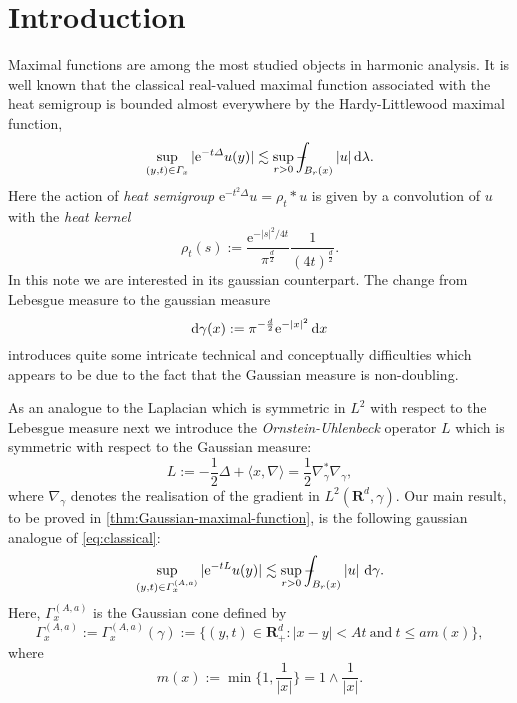 \documentclass[a4paper,oneside,10pt]{amsproc}
\theoremstyle{remark}
\newcommand{\D}{\,\textup{d}}
\newcommand{\la}{\langle}
\newcommand{\ra}{\rangle}
\def\Xint#1{\mathchoice
  {\XXint\displaystyle\textstyle{#1}}%
  {\XXint\textstyle\scriptstyle{#1}}%
  {\XXint\scriptstyle\scriptscriptstyle{#1}}%
  {\XXint\scriptscriptstyle\scriptscriptstyle{#1}}%
  \!\int}
\def\XXint#1#2#3{{\setbox0=\hbox{$#1{#2#3}{\int}$ }
    \vcenter{\hbox{$#2#3$ }}\kern-.535\wd0}}
\def\dashint{\Xint-}
\renewcommand{\leq}{\leqslant}
\renewcommand{\leq}{\leqslant}
\newcommand{\R}{\mathbf R}
\newcommand{\e}{\mathrm{e}} %
\renewcommand{\leq}{\leqslant}%
\begin{document}
\section{Introduction}
Maximal functions are among the most studied objects in harmonic
analysis. 
It is well known that the classical real-valued maximal
function associated with the heat semigroup is bounded almost everywhere
by the Hardy-Littlewood maximal function, 
\begin{equation}\label{eq:classical}
  \sup_{(y, t) \in \Gamma_x} |\e^{-t \Delta} u(y)| \lesssim \sup_{r
    > 0}  \dashint_{B_r(x)} |u| \D\lambda.
\end{equation}
Here the action of \emph{heat semigroup} $\e^{-t^2 \Delta} u = \rho_t \ast u$ is
given by a convolution of $u$ with the \emph{heat kernel}
\begin{equation*}
  \rho_t(s) := \frac{\e^{-|s|^2/4t}}{\pi^{\frac{d}2}}
  \frac1{(4t)^{\frac{d}2}}.
\end{equation*}
In this note we are interested in its gaussian counterpart. 
The change from Lebesgue measure to the gaussian measure
\begin{equation}
  \label{eq:Gaussian-measure}
  \mathrm{d}\gamma(x) := \pi^{-\frac{d}2} \e^{-|x|^2} \D{x}
\end{equation}
introduces quite
some intricate technical and conceptually difficulties which appears
to be due to the fact that the Gaussian measure is non-doubling.

As an analogue to the Laplacian which is symmetric in $L^2$ with
respect to the Lebesgue measure next we introduce the
\emph{Ornstein-Uhlenbeck} operator $L$ which is symmetric with respect
to the Gaussian measure:
\begin{equation}
  \label{eq:Ornstein-Uhlenbeck-operator}
  L := -\frac12 \Delta + \la x, \nabla \ra = \frac12 \nabla_\gamma^* \nabla_\gamma,
\end{equation}
where $\nabla_\gamma$ denotes the realisation of the gradient in $L^2(\R^d,\gamma)$.
Our main result, to be proved in  \eqref{thm:Gaussian-maximal-function}, is the 
following gaussian analogue of \eqref{eq:classical}:
\begin{equation}\label{eq:main}
  \sup_{(y, t) \in \Gamma_x^{(A, a)}} |\e^{-t L} u(y)| \lesssim
  \sup_{r > 0} \dashint_{B_r(x)} |u| \, \D\gamma.
\end{equation}
Here, $\Gamma_x^{(A, a)}$ is the Gaussian cone defined by
\begin{equation}
  \label{eq:Gaussian-cone}
  \Gamma_x^{(A, a)} := \Gamma_x^{(A, a)}(\gamma) := \{(y, t) \in
  \R^d_+ : |x - y| < At \:\text{and}\: t \leq a m(x)\},
\end{equation}
where
\begin{equation}\label{eq:m-function}
  m(x) := \min\biggl\{1, \frac1{|x|} \biggr\} = 1 \wedge \frac1{|x|}.
\end{equation}
\end{document}
